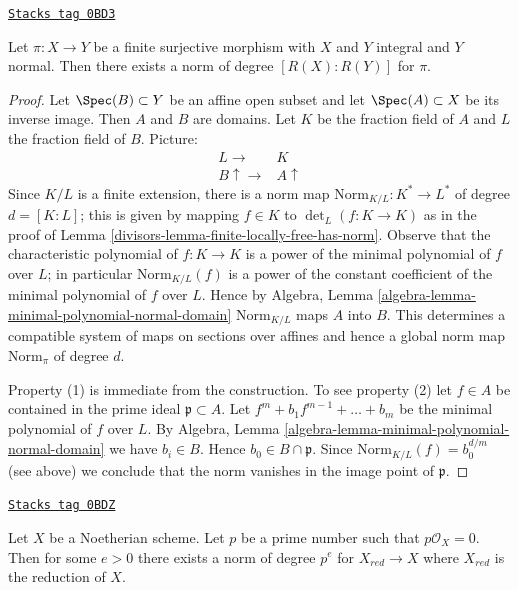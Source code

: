 \begin{lemma}
\label{divisors-lemma-norm-in-normal-case}
\href{https://stacks.math.columbia.edu/tag/0BD3}{\texttt{Stacks tag 0BD3}}

Let $\pi : X \to Y$ be a finite surjective morphism with $X$ and $Y$
integral and $Y$ normal. Then there exists a norm of degree
$[R(X) : R(Y)]$ for $\pi$.
\end{lemma}

\begin{proof}

Let $\Spec(B) \subset Y$ be an affine open subset and let
$\Spec(A) \subset X$ be its inverse image. Then $A$ and $B$
are domains. Let $K$ be the fraction
field of $A$ and $L$ the fraction field of $B$. Picture:
$$
\begin{array}{cc}L \longrightarrow & K \\ B \uparrow\longrightarrow & A \uparrow\end{array}
$$
Since $K/L$ is a finite extension, there is a norm map
$\text{Norm}_{K/L} : K^* \to L^*$ of degree $d = [K : L]$; this is given by
mapping $f \in K$ to $\det_L(f : K \to K)$ as in the proof
of Lemma \ref{divisors-lemma-finite-locally-free-has-norm}.
Observe that the characteristic polynomial of $f : K \to K$
is a power of the minimal polynomial of $f$ over $L$;
in particular $\text{Norm}_{K/L}(f)$ is a power of the constant
coefficient of the minimal polynomial of $f$ over $L$. Hence by
Algebra, Lemma \ref{algebra-lemma-minimal-polynomial-normal-domain}
$\text{Norm}_{K/L}$ maps $A$ into $B$.
This determines a compatible system of maps
on sections over affines and hence a global norm map
$\text{Norm}_\pi$ of degree $d$.

\medskip\noindent
Property (1) is immediate from the construction.
To see property (2) let $f \in A$ be contained in the
prime ideal $\mathfrak p \subset A$. Let
$f^m + b_1 f^{m - 1} + \ldots + b_m$ be the minimal
polynomial of $f$ over $L$. By
Algebra, Lemma \ref{algebra-lemma-minimal-polynomial-normal-domain}
we have $b_i \in B$. Hence $b_0 \in B \cap \mathfrak p$.
Since $\text{Norm}_{K/L}(f) = b_0^{d/m}$ (see above)
we conclude that the norm vanishes in the image point of $\mathfrak p$.
\end{proof}

\begin{lemma}
\label{divisors-lemma-Frobenius-gives-norm-for-reduction}
\href{https://stacks.math.columbia.edu/tag/0BDZ}{\texttt{Stacks tag 0BDZ}}

Let $X$ be a Noetherian scheme. Let $p$ be a prime number such that
$p\mathcal{O}_X = 0$. Then for some $e > 0$ there exists a norm
of degree $p^e$ for $X_{red} \to X$ where $X_{red}$ is the reduction
of $X$.
\end{lemma}

